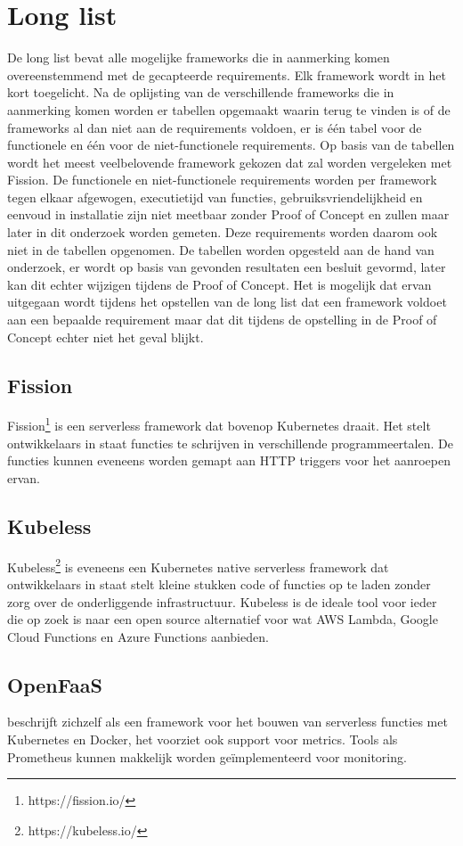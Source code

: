 \section{Long list}
De long list bevat alle mogelijke frameworks die in aanmerking komen overeenstemmend met de gecapteerde requirements. Elk framework wordt in het kort toegelicht. Na de oplijsting van de verschillende frameworks die in aanmerking komen worden er tabellen opgemaakt waarin terug te vinden is of de frameworks al dan niet aan de requirements voldoen, er is één tabel voor de functionele en één voor de niet-functionele requirements. Op basis van de tabellen wordt het meest veelbelovende framework gekozen dat zal worden vergeleken met Fission. De functionele en niet-functionele requirements worden per framework tegen elkaar afgewogen, executietijd van functies, gebruiksvriendelijkheid en eenvoud in installatie zijn niet meetbaar zonder Proof of Concept en zullen maar later in dit onderzoek worden gemeten. Deze requirements worden daarom ook niet in de tabellen opgenomen. De tabellen worden opgesteld aan de hand van onderzoek, er wordt op basis van gevonden resultaten een besluit gevormd, later kan dit echter wijzigen tijdens de Proof of Concept. Het is mogelijk dat ervan uitgegaan wordt tijdens het opstellen van de long list dat een framework voldoet aan een bepaalde requirement maar dat dit tijdens de opstelling in de Proof of Concept echter niet het geval blijkt.

\subsection{Fission}
Fission\footnote{https://fission.io/} is een serverless framework dat bovenop Kubernetes draait. Het stelt ontwikkelaars in staat functies te schrijven in verschillende programmeertalen. De functies kunnen eveneens worden gemapt aan HTTP triggers voor het aanroepen ervan.

\subsection{Kubeless}
Kubeless\footnote{https://kubeless.io/} is eveneens een Kubernetes native serverless framework dat ontwikkelaars in staat stelt kleine stukken code of functies op te laden zonder zorg over de onderliggende infrastructuur. Kubeless is de ideale tool voor ieder die op zoek is naar een open source alternatief voor wat AWS Lambda, Google Cloud Functions en Azure Functions aanbieden.

\subsection{OpenFaaS}
\textcite{OpenFaaS2019} beschrijft zichzelf als een framework voor het bouwen van serverless functies met Kubernetes en Docker, het voorziet ook support voor metrics. Tools als Prometheus kunnen makkelijk worden geïmplementeerd voor monitoring.

